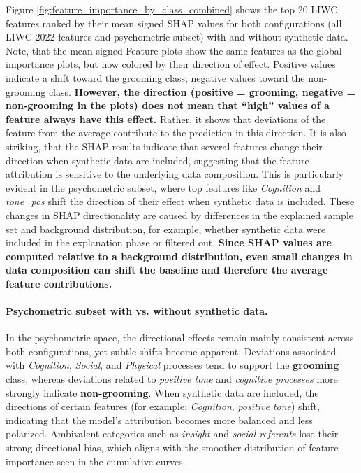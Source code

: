Figure \ref{fig:feature_importance_by_class_combined} shows the top 20 LIWC features ranked by their mean signed SHAP values for both configurations (all LIWC-2022 features and psychometric subset) with and without synthetic data. Note, that the mean signed Feature plots show the same features as the global importance plots, but now colored by their direction of effect. Positive values indicate a shift toward the grooming class, negative values toward the non-grooming class. \textbf{However, the direction (positive = grooming, negative = non-grooming in the plots) does not mean that “high” values of a feature always have this effect.} Rather, it shows that deviations of the feature from the average contribute to the prediction in this direction. It is also striking, that the SHAP results indicate that several features change their direction when synthetic data are included, suggesting that the feature attribution is sensitive to the underlying data composition. This is particularly evident in the psychometric subset, where top features like \textit{Cognition} and \textit{tone\_pos} shift the direction of their effect when synthetic data is included. These changes in SHAP directionality are caused by differences in the explained sample set and background distribution, for example, whether synthetic data were included in the explanation phase or filtered out. \textbf{Since SHAP values are computed relative to a background distribution, even small changes in data composition can shift the baseline and therefore the average feature contributions.} 


\paragraph{Psychometric subset with vs. without synthetic data.}
In the psychometric space, the directional effects remain mainly consistent across both configurations, yet subtle shifts become apparent. Deviations associated with \emph{Cognition}, \emph{Social}, and \emph{Physical} processes tend to support the \textbf{grooming} class, whereas deviations related to \emph{positive tone} and \emph{cognitive processes} more strongly indicate \textbf{non-grooming}. When synthetic data are included, the directions of certain features (for example: \textit{Cognition}, \textit{positive tone}) shift, indicating that the model’s attribution becomes more balanced and less polarized. Ambivalent categories such as \textit{insight} and \textit{social referents} lose their strong directional bias, which aligns with the smoother distribution of feature importance seen in the cumulative curves. 


